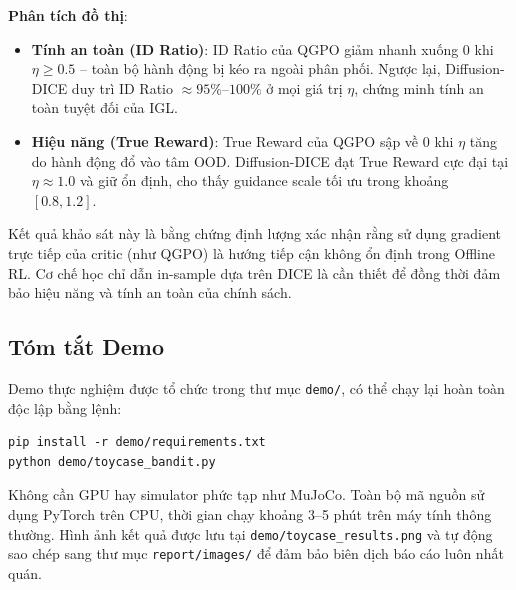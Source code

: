 \textbf{Phân tích đồ thị}:
\begin{itemize}
    \item \textbf{Tính an toàn (ID Ratio)}: ID Ratio của QGPO giảm nhanh xuống 0 khi $\eta \geq 0.5$ -- toàn bộ hành động bị kéo ra ngoài phân phối. Ngược lại, Diffusion-DICE duy trì ID Ratio $\approx 95\%$--$100\%$ ở mọi giá trị $\eta$, chứng minh tính an toàn tuyệt đối của IGL.
    \item \textbf{Hiệu năng (True Reward)}: True Reward của QGPO sập về 0 khi $\eta$ tăng do hành động đổ vào tâm OOD. Diffusion-DICE đạt True Reward cực đại tại $\eta \approx 1.0$ và giữ ổn định, cho thấy guidance scale tối ưu trong khoảng $[0.8, 1.2]$.
\end{itemize}

Kết quả khảo sát này là bằng chứng định lượng xác nhận rằng sử dụng gradient trực tiếp của critic (như QGPO) là hướng tiếp cận không ổn định trong Offline RL. Cơ chế học chỉ dẫn in-sample dựa trên DICE là cần thiết để đồng thời đảm bảo hiệu năng và tính an toàn của chính sách.

\subsection{Tóm tắt Demo}
Demo thực nghiệm được tổ chức trong thư mục \texttt{demo/}, có thể chạy lại hoàn toàn độc lập bằng lệnh:
\begin{verbatim}
pip install -r demo/requirements.txt
python demo/toycase_bandit.py
\end{verbatim}
Không cần GPU hay simulator phức tạp như MuJoCo. Toàn bộ mã nguồn sử dụng PyTorch trên CPU, thời gian chạy khoảng 3--5 phút trên máy tính thông thường. Hình ảnh kết quả được lưu tại \texttt{demo/toycase\_results.png} và tự động sao chép sang thư mục \texttt{report/images/} để đảm bảo biên dịch báo cáo luôn nhất quán.
